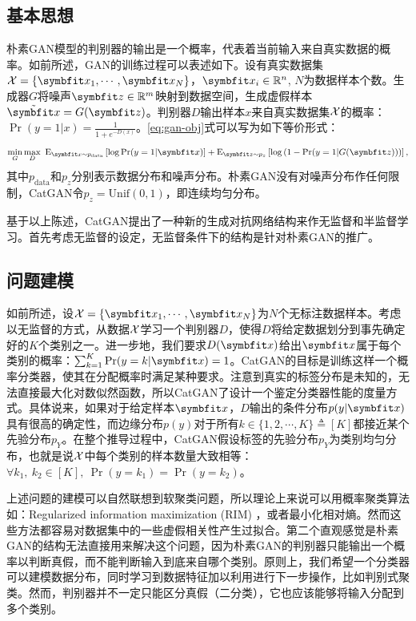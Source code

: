 \subsection{基本思想}
朴素GAN模型的判别器的输出是一个概率，代表着当前输入来自真实数据的概率。如前所述，GAN的训练过程可以表述如下。设有真实数据集$\Set{X} = \{\bd{x}_1, \cdots, \bd{x}_N\}$，$\bd{x}_i \in \reals^n$, $N$为数据样本个数。生成器$G$将噪声$\bd{z}\in \reals^m$映射到数据空间，生成虚假样本$\tilde{\bd{x}} = G(\bd{z})$。判别器$D$输出样本$x$来自真实数据集$\mathcal{X}$的概率：$\Pr(y=1 | x) = \frac{1}{1 + e^{-D(x)}}$。\eqref{eq:gan-obj}式可以写为如下等价形式：
\begin{equation}
  \min_G\max_D ~\E_{\bd{x} \sim p_{\text{data}}} \left[ \log \Pr(y=1|\bd{x}) \right]
  + \E_{\bd{z} \sim p_z} \left[ \log\left( 1 - \Pr(y=1|G(\bd{z})) \right) \right],
\end{equation}
其中$p_{\text{data}}$和$p_z$分别表示数据分布和噪声分布。朴素GAN没有对噪声分布作任何限制，CatGAN令$p_z = \text{Unif}(0,1)$，即连续均匀分布。

基于以上陈述，CatGAN提出了一种新的生成对抗网络结构来作无监督和半监督学习。首先考虑无监督的设定，无监督条件下的结构是针对朴素GAN的推广。

\subsection{问题建模}\label{sec:catgan-ps}
如前所述，设$\Set{X} = \{\bd{x}_1, \cdots, \bd{x}_N\}$为$N$个无标注数据样本。考虑以无监督的方式，从数据$\mathcal{X}$学习一个判别器$D$，使得$D$将给定数据划分到事先确定好的$K$个类别之一。进一步地，我们要求$D(\bd{x})$给出$\bd{x}$属于每个类别的概率：$\sum_{k=1}^K \Pr(y=k|\bd{x}) = 1$。CatGAN的目标是训练这样一个概率分类器，使其在分配概率时满足某种要求。注意到真实的标签分布是未知的，无法直接最大化对数似然函数，所以CatGAN了设计一个鉴定分类器性能的度量方式。具体说来，如果对于给定样本$\bd{x}$，$D$输出的条件分布$p(y|\bd{x})$具有很高的确定性，而边缘分布$p(y)$对于所有$k \in \{1,2,\cdots,K\} \triangleq [K]$都接近某个先验分布$p_Y$。在整个推导过程中，CatGAN假设标签的先验分布$p_Y$为类别均匀分布，也就是说$\mathcal{X}$中每个类别的样本数量大致相等：$\forall k_1, ~k_2 \in [K], ~\Pr(y=k_1) = \Pr(y=k_2)$。

上述问题的建模可以自然联想到软聚类问题，所以理论上来说可以用概率聚类算法如：Regularized information maximization (RIM) \citep{krause2010discriminative}，或者最小化相对熵\citep{grandvalet2005semi}。然而这些方法都容易对数据集中的一些虚假相关性产生过拟合。第二个直观感觉是朴素GAN的结构无法直接用来解决这个问题，因为朴素GAN的判别器只能输出一个概率以判断真假，而不能判断输入到底来自哪个类别。原则上，我们希望一个分类器可以建模数据分布，同时学习到数据特征加以利用进行下一步操作，比如判别式聚类。然而，判别器并不一定只能区分真假（二分类），它也应该能够将输入分配到多个类别。

